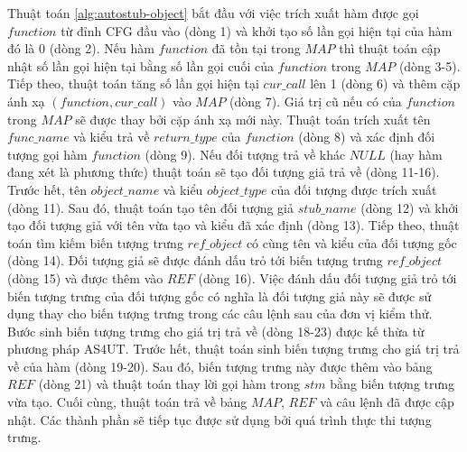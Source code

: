 Thuật toán \autoref{alg:autostub-object} bắt đầu với việc trích xuất hàm được gọi $function$ từ đỉnh CFG đầu vào (dòng 1) và khởi tạo số lần gọi hiện tại của hàm đó là 0 (dòng 2). Nếu hàm $function$ đã tồn tại trong $MAP$ thì thuật toán cập nhật số lần gọi hiện tại bằng số lần gọi cuối của $function$ trong $MAP$ (dòng 3-5). Tiếp theo, thuật toán tăng số lần gọi hiện tại $cur\_call$ lên 1 (dòng 6) và thêm cặp ánh xạ $(function, cur\_call)$ vào $MAP$ (dòng 7). Giá trị cũ nếu có của $function$ trong $MAP$ sẽ được thay bởi cặp ánh xạ mới này. Thuật toán trích xuất tên $func\_name$ và kiểu trả về $return\_type$ của $function$ (dòng 8) và xác định đối tượng gọi hàm $function$ (dòng 9). Nếu đối tượng trả về khác $NULL$ (hay hàm đang xét là phương thức) thuật toán sẽ tạo đối tượng giả trả về (dòng 11-16). Trước hết, tên $object\_name$ và kiểu $object\_type$ của đối tượng được trích xuất (dòng 11). Sau đó, thuật toán tạo tên đối tượng giả $stub\_name$ (dòng 12) và khởi tạo đối tượng giả với tên vừa tạo và kiểu đã xác định (dòng 13). Tiếp theo, thuật toán tìm kiếm biến tượng trưng $ref\_object$ có cùng tên và kiểu của đối tượng gốc (dòng 14). Đối tượng giả sẽ được đánh dấu trỏ tới biến tượng trưng $ref\_object$ (dòng 15) và được thêm vào $REF$ (dòng 16). Việc đánh dấu đối tượng giả trỏ tới biến tượng trưng của đối tượng gốc có nghĩa là đối tượng giả này sẽ được sử dụng thay cho biến tượng trưng trong các câu lệnh sau của đơn vị kiểm thử. Bước sinh biến tượng trưng cho giá trị trả về (dòng 18-23) được kế thừa từ phương pháp AS4UT. Trước hết, thuật toán sinh biến tượng trưng cho giá trị trả về của hàm (dòng 19-20). Sau đó, biến tượng trưng này được thêm vào bảng $REF$ (dòng 21) và thuật toán thay lời gọi hàm trong $stm$ bằng biến tượng trưng vừa tạo. Cuối cùng, thuật toán trả về bảng $MAP$, $REF$ và câu lệnh đã được cập nhật. Các thành phần sẽ tiếp tục được sử dụng bởi quá trình thực thi tượng trưng.  

